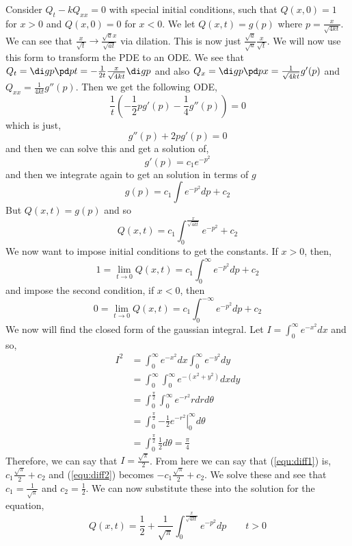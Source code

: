 \noindent
Consider $Q_t - kQ_{xx} = 0$ with special initial conditions, such that $Q(x, 0) = 1$ for $x > 0$ and $Q(x, 0) = 0$ for $x < 0$. We let $Q(x, t) = g(p)$ where $p = \frac{x}{\sqrt{4kt}}$. We can see that $\frac{x}{\sqrt t} \to \frac{\sqrt a x}{\sqrt{at}}$ via dilation. This is now just $\frac{\sqrt a}{\sqrt a} \frac{x}{\sqrt t}$.
We will now use this form to transform the PDE to an ODE. We see that $Q_t = \di g p\pd p t = -\frac{1}{2t}\frac{x}{\sqrt{4kt}}\di g p$ and also $Q_x = \di g p \pd p x = \frac{1}{\sqrt{4kt}} g'(p)$ and $Q_{xx} = \frac{1}{4kt}g''(p)$. Then we get the following ODE,
$$ \frac{1}{t}\left( - \frac{1}{2}pg'(p) - \frac{1}{4}g''(p) \right) = 0 $$
which is just,
$$ g''(p) + 2pg'(p) = 0 $$
and then we can solve this and get a solution of,
$$ g'(p) = c_1e^{-p^2} $$
and then we integrate again to get an solution in terms of $g$
$$ g(p) = c_1\int e^{-p^2}dp + c_2 $$
But $Q(x, t) = g(p)$ and so
$$ Q(x, t) = c_1\int_0^{\frac{x}{\sqrt{4kt}}} e^{-p^2} + c_2 $$
We now want to impose initial conditions to get the constants. If $x > 0$, then,
\begin{equation}
  1 = \lim_{t \to 0} Q(x, t) = c_1\int_0^\infty e^{-p^2}dp + c_2 \label{equ:diff1}
\end{equation}
and impose the second condition, if $x < 0$, then
\begin{equation}
  0 = \lim_{t \to 0} Q(x, t) = c_1 \int_0^{-\infty} e^{-p^2}dp + c_2 \label{equ:diff2}
\end{equation}
We now will find the closed form of the gaussian integral. Let $I = \int_0^\infty e^{-x^2}dx$ and so,
\begin{align*}
  I^2 &= \int_0^\infty e^{-x^2}dx\int_0^\infty e^{-y^2}dy\\
  &= \int_0^\infty\int_0^\infty e^{-(x^2 + y^2)}dxdy \\
  &= \int_0^{\frac{\pi }{2}}\int_0^\infty e^{-r^2}rdrd \theta\\
  &= \int_0^{\frac{\pi }{2}} \left.-\frac{1}{2}e^{-r^2}\right|_{0}^\infty d\theta \\
  &= \int_0^{\frac{\pi }{2}} \frac{1}{2}d \theta = \frac{\pi}{4}
\end{align*}
Therefore, we can say that $I = \frac{\sqrt{\pi}}{2}$. From here we can say that (\ref{equ:diff1}) is, $c_1 \frac{\sqrt \pi}{2} + c_2$ and (\ref{equ:diff2}) becomes $-c_1 \frac{\sqrt \pi}{2} + c_2$. We solve these and see that $c_1 = \frac{1}{\sqrt \pi}$ and $c_2 = \frac{1}{2}$.
We can now substitute these into the solution for the equation,
$$ Q(x, t) = \frac{1}{2} + \frac{1}{\sqrt \pi} \int_0^{\frac{x}{\sqrt{4kt}}} e^{-p^2}dp \qquad t > 0 $$
